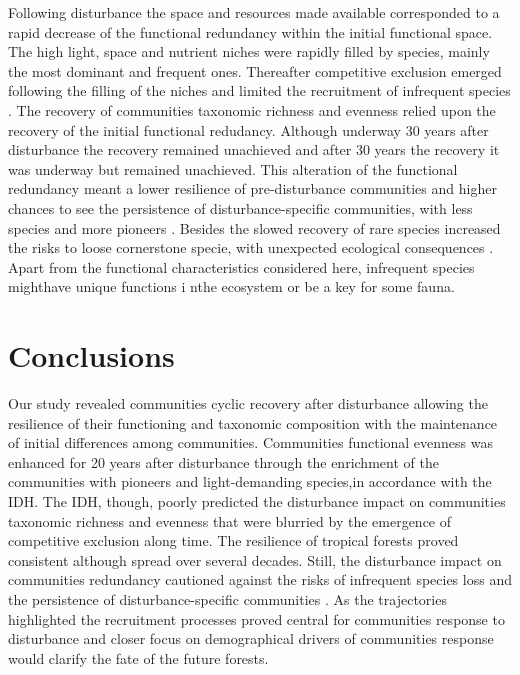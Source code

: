 \documentclass[fleqn,10pt]{ArtEcoFoG} %
\begin{document}
Following disturbance the space and resources made available
corresponded to a rapid decrease of the functional redundancy within the
initial functional space. The high light, space and nutrient niches were
rapidly filled by species, mainly the most dominant and frequent ones.
Thereafter competitive exclusion emerged following the filling of the
niches and limited the recruitment of infrequent species
\citep{Busing2002}. The recovery of communities taxonomic richness and
evenness relied upon the recovery of the initial functional redudancy.
Although underway 30 years after disturbance the recovery remained
unachieved and after 30 years the recovery it was underway but remained
unachieved. This alteration of the functional redundancy meant a lower
resilience of pre-disturbance communities and higher chances to see the
persistence of disturbance-specific communities, with less species and
more pioneers \citep{Haddad2008, Burslem2000, Martin2013}. Besides the
slowed recovery of rare species increased the risks to loose cornerstone
specie, with unexpected ecological consequences
\citep{Jones1994, Chazdon2003a, Diaz2005, Gardner2007}. Apart from the
functional characteristics considered here, infrequent species mighthave
unique functions i nthe ecosystem or be a key for some fauna.

\section{Conclusions}\label{conclusions}

Our study revealed communities cyclic recovery after disturbance
allowing the resilience of their functioning and taxonomic composition
with the maintenance of initial differences among communities.
Communities functional evenness was enhanced for 20 years after
disturbance through the enrichment of the communities with pioneers and
light-demanding species,in accordance with the IDH. The IDH, though,
poorly predicted the disturbance impact on communities taxonomic
richness and evenness that were blurried by the emergence of competitive
exclusion along time. The resilience of tropical forests proved
consistent although spread over several decades. Still, the disturbance
impact on communities redundancy cautioned against the risks of
infrequent species loss and the persistence of disturbance-specific
communities \citep{Gourlet-Fleury2005}. As the trajectories highlighted
the recruitment processes proved central for communities response to
disturbance and closer focus on demographical drivers of communities
response would clarify the fate of the future forests.



\makeatletter

\makeatother


\end{document}
